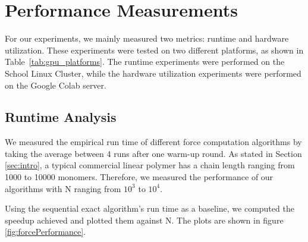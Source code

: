 \documentclass[12pt]{article}
\begin{document}
\begin{table}[h]
\centering
\caption{Summary of GPU Platforms Used for Testing}
\label{tab:gpu_platforms}
\end{table}

\section{Performance Measurements}

For our experiments, we mainly measured two metrics: runtime and hardware utilization. These experiments were tested on two different platforms, as shown in Table~\ref{tab:gpu_platforms}. The runtime experiments were performed on the School Linux Cluster, while the hardware utilization experiments were performed on the Google Colab server.

\subsection{Runtime Analysis}
We measured the empirical run time of different force computation algorithms by taking the average between 4 runs after one warm-up round. As stated in Section \ref{sec:intro}, a typical commercial linear polymer has a chain length ranging from 1000 to 10000 monomers. Therefore, we measured the performance of our algorithms with N ranging from $10^3$ to $10^4$.

Using the sequential exact algorithm’s run time as a baseline, we computed the speedup achieved and plotted them against N. The plots are shown in figure \ref{fig:forcePerformance}.
\end{document}
